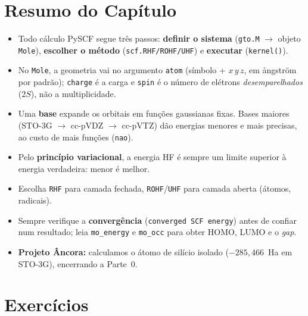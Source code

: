 \documentclass[11pt,a4paper,openany]{book}
\newcommand{\code}[1]{\texttt{#1}}
\begin{document}
\section*{Resumo do Capítulo}

\begin{itemize}[leftmargin=*]
  \item Todo cálculo PySCF segue três passos: \textbf{definir o sistema}
        (\code{gto.M} $\rightarrow$ objeto \code{Mole}), \textbf{escolher o método}
        (\code{scf.RHF/ROHF/UHF}) e \textbf{executar} (\code{kernel()}).
  \item No \code{Mole}, a geometria vai no argumento \code{atom} (símbolo + $x\,y\,z$,
        em ångström por padrão); \code{charge} é a carga e \code{spin} é o número de
        elétrons \emph{desemparelhados} ($2S$), não a multiplicidade.
  \item Uma \textbf{base} expande os orbitais em funções gaussianas fixas. Bases
        maiores (STO-3G $\rightarrow$ cc-pVDZ $\rightarrow$ cc-pVTZ) dão energias
        menores e mais precisas, ao custo de mais funções (\code{nao}).
  \item Pelo \textbf{princípio variacional}, a energia HF é sempre um limite
        superior à energia verdadeira: menor é melhor.
  \item Escolha \code{RHF} para camada fechada, \code{ROHF}/\code{UHF} para camada
        aberta (átomos, radicais).
  \item Sempre verifique a \textbf{convergência} (\code{converged SCF energy}) antes
        de confiar num resultado; leia \code{mo\_energy} e \code{mo\_occ} para obter
        HOMO, LUMO e o \emph{gap}.
  \item \textbf{Projeto Âncora:} calculamos o átomo de silício isolado
        ($-285{,}466$~Ha em STO-3G), encerrando a Parte~0.
\end{itemize}

\section*{Exercícios}
\end{document}
